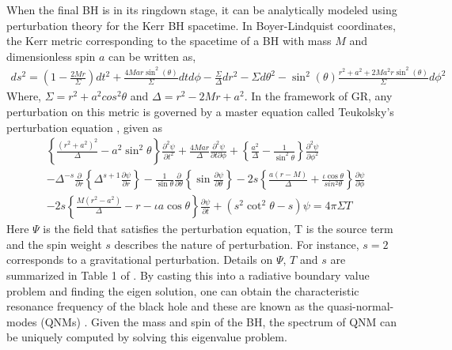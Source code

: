 When the final BH is in its ringdown stage, it can be analytically modeled using perturbation theory for the Kerr BH spacetime. In Boyer-Lindquist coordinates, the Kerr metric corresponding to the spacetime of a BH with mass $M$ and dimensionless spin $a$ can be written as, 
\begin{align}
ds^{2}=(1 - \frac{2Mr}{\Sigma})dt^{2} + \frac{4Mar \sin^{2}(\theta)}{\Sigma} dtd\phi - \frac{\Sigma}{\Delta} dr^{2} - \Sigma d\theta^{2} -\sin^{2}(\theta)\frac{r^{2}+a^{2}+2Ma^{2}r \sin^{2}(\theta)}{\Sigma} d\phi^{2} 
\end{align}
Where, $\Sigma = r^{2} + a^{2} cos^{2} \theta$ and $\Delta = r^{2} - 2Mr + a^{2}$. In the framework of GR, any perturbation on this metric is governed by a master equation called Teukolsky's perturbation equation \cite{Teukolsky1,Teukolsky2, Teukolsky3} , given as
\begin{align*}
\left\lbrace \frac{(r^{2}+a^{2})^{2}}{\Delta} - a^{2} \sin^{2} \theta \right\rbrace \frac{\partial^{2}\psi}{\partial t^{2}} + \frac{4Mar}{\Delta} \frac{\partial^{2}\psi}{\partial t \partial \phi} + \left\lbrace \frac{a^{2}}{\Delta} - \frac{1}{\sin^{2} \theta}\right\rbrace \frac{\partial^{2}\psi}{\partial \phi^{2}} 
\\- \Delta^{-s} \frac{\partial}{\partial r} \left\lbrace \Delta^{s+1} \frac{\partial \psi}{\partial r} \right\rbrace - \frac{1}{\sin \theta} \frac{\partial}{\partial \theta} \left\lbrace \sin \frac{\partial \psi}{\partial \theta} \right\rbrace - 2s \left\lbrace\frac{a(r-M)}{\Delta} + \frac{\iota \cos \theta}{sin^{2} \theta} \right\rbrace \frac{\partial \psi}{\partial \phi} 
\\- 2s \left\lbrace \frac{M(r^{2}-a^{2})}{\Delta} - r - \iota a \cos \theta \right\rbrace \frac{\partial \psi}{\partial t} + (s^{2} \cot^{2}
 \theta -s)\psi = 4 \pi \Sigma T
 \end{align*}
Here $\Psi$ is the field that satisfies the perturbation equation, T is the source term and the spin weight $s$ describes the nature of perturbation. For instance, $s=2$ corresponds to a gravitational perturbation. Details on $\Psi$, $T$ and $s$ are summarized in Table 1 of \cite{Teukolsky1}. By casting this into a radiative boundary value problem and finding the eigen solution, one can obtain the characteristic resonance frequency of the black hole and these are known as the quasi-normal-modes (QNMs) \cite{10.2307/78902,1985RSPSA.402..285L}. Given the mass and spin of the BH, the spectrum of QNM can be uniquely computed by solving this eigenvalue problem. 

